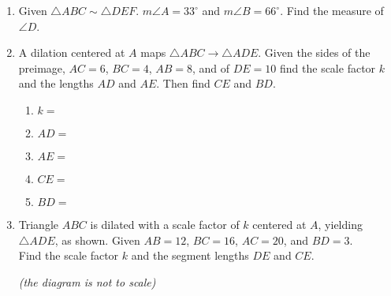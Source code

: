 \documentclass[12pt, twoside]{article}
\begin{document}
\begin{enumerate}
    \item Given $\triangle ABC \sim \triangle DEF$. $m\angle A = 33^\circ$ and $m\angle B = 66^\circ$. Find the measure of $\angle D$.
    
\newpage
  \item A dilation centered at $A$ maps $\triangle ABC \rightarrow \triangle ADE$. Given the sides of the preimage, $AC = 6$, $BC = 4$, $AB = 8$, and of $DE = 10$ find the scale factor $k$ and the lengths $AD$ and $AE$. Then find $CE$ and $BD$. 
  \begin{multicols}{2}
    \begin{enumerate}
      \item $k=$ \vspace{0.3cm}
      \item $AD=$ \vspace{0.3cm}
      \item $AE=$ \vspace{0.3cm}
      \item $CE=$
      \item $BD=$
    \end{enumerate}
  \begin{flushright}
  \end{flushright} 
\end{multicols}\vspace{1.5cm}
  
  \item Triangle $ABC$ is dilated with a scale factor of $k$ centered at $A$, yielding $\triangle ADE$, as shown. Given $AB=12$, $BC=16$, $AC=20$, and $BD=3$. \\[0.25cm] Find the scale factor $k$ and the segment lengths $DE$ and $CE$.
  \begin{flushright} \emph{(the diagram is not to scale)} \end{flushright}
    \begin{flushright}
    \end{flushright} \vspace{2.5cm}


\end{enumerate}
\end{document}
